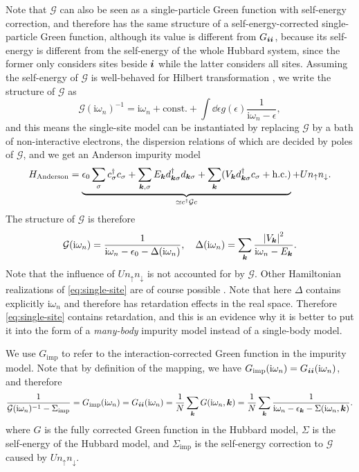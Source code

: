 \documentclass[hyperref, a4paper]{article}
\newcommand*{\ii}{\mathrm{i}}
\begin{document}
Note that $\mathcal{G}$ can also be seen as a single-particle Green function 
with self-energy correction,
and therefore has the same structure of 
a self-energy-corrected single-particle Green function,
although its value is different from $G_{\vb*{i} \vb*{i}}$,
because its self-energy is different from the self-energy of the whole Hubbard system,
since the former only considers sites beside $\vb*{i}$
while the latter considers all sites.
Assuming the self-energy of $\mathcal{G}$ is well-behaved
for Hilbert transformation \cite{georges1996dynamical},
we write the structure of $\mathcal{G}$ as  
\[
    \mathcal{G}(\ii \omega_n)^{-1} = 
    \ii \omega_n + \text{const.} + \int \dd{\epsilon} g(\epsilon) \frac{1}{\ii \omega_n - \epsilon},
\]
and this means the single-site model can be instantiated 
by replacing $\mathcal{G}$ by a bath of non-interactive electrons,
the dispersion relations of which 
are decided by poles of $\mathcal{G}$,
and we get an Anderson impurity model
\begin{equation}
    H_{\text{Anderson}} = 
    \underbrace{
        \epsilon_0 \sum_\sigma c_{\sigma}^\dagger c_{\sigma}
        + \sum_{\vb*{k}, \sigma} E_{\vb*{k}} d^\dagger_{\vb*{k} \sigma} d_{\vb*{k} \sigma}
        + \sum_{\vb*{k}} (V_{\vb*{k}} d^\dagger_{\vb*{k} \sigma} c_{\sigma} + \text{h.c.})
    }_{\simeq c^\dagger \mathcal{G} c}
    + U n_{\uparrow} n_{\downarrow}.
\end{equation}
The structure of $\mathcal{G}$ is therefore 
\begin{equation}
    \mathcal{G} (\ii \omega_n) = \frac{1}{\ii \omega_n - \epsilon_0 - \Delta(\ii \omega_n)}, \quad 
    \Delta(\ii \omega_n) = \sum_{\vb*{k}} \frac{\abs{V_{\vb*{k}}}^2}{\ii \omega_n - E_{\vb*{k}}}.
\end{equation}
Note that the influence of $U n_{\uparrow} n_{\downarrow}$ is not 
accounted for by $\mathcal{G}$.
Other Hamiltonian realizations of \eqref{eq:single-site} are of course possible
\cite{georges1996dynamical}.
Note that here $\Delta$ contains explicitly $\ii \omega_n$
and therefore has retardation effects 
in the real space.
Therefore \eqref{eq:single-site} contains retardation,
and this is an evidence why it is better to put it into 
the form of a \emph{many-body} impurity model instead of a single-body model.

We use $G_{\text{imp}}$ to refer to the interaction-corrected Green function in the impurity model.
Note that by definition of the mapping, we have 
$G_{\text{imp}}(\ii \omega_n) = G_{\vb*{i} \vb*{i}}(\ii \omega_n)$,
and therefore 
\begin{equation}
    \frac{1}{\mathcal{G}(\ii \omega_n)^{-1} - \Sigma_{\text{imp}}} 
    = {G}_{\text{imp}}(\ii \omega_n) = G_{\vb*{i} \vb*{i}}(\ii \omega_n)
    = \frac{1}{N} \sum_{\vb*{k}} G(\ii \omega_n, \vb*{k})
    = \frac{1}{N} \sum_{\vb*{k}} \frac{1}{\ii \omega_n - \epsilon_{\vb*{k}} - \Sigma(\ii \omega_n, \vb*{k})}.
\end{equation}
where $G$ is the fully corrected Green function in the Hubbard model,
$\Sigma$ is the self-energy of the Hubbard model,
and $\Sigma_{\text{imp}}$ is the self-energy correction to $\mathcal{G}$
caused by $U n_{\uparrow} n_{\downarrow}$.
\end{document}
